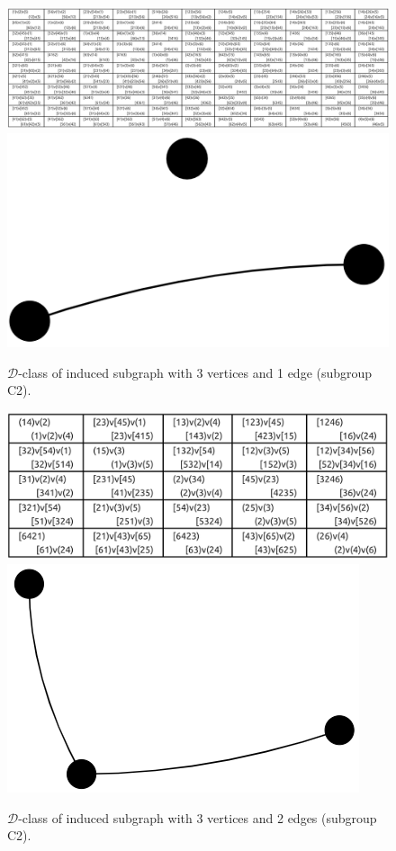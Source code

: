 \begin{appendices}
\begin{figure}[H]
\includegraphics[width=\textwidth, keepaspectratio]{images/x1/x1_3v_1e.png}
\includegraphics[scale=0.15]{images/x1/x1_3v_1e_vis.png}
\caption{$\mathcal{D}$-class of induced subgraph with 3 vertices and 1 edge (subgroup C2).}
\end{figure}

\begin{figure}[H]
\includegraphics[scale=0.08]{images/x1/x1_3v_2e.png}
\includegraphics[scale=0.12]{images/x1/x1_3v_2e_vis.png}
\caption{$\mathcal{D}$-class of induced subgraph with 3 vertices and 2 edges (subgroup C2).}
\end{figure}


\end{appendices}

